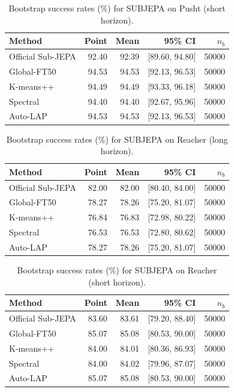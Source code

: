 \begin{table}[t]
\centering
\small
\caption{Bootstrap success rates (\%) for SUBJEPA on Pusht (short horizon).}
\begin{tabular}{lrrrr}
\toprule
Method & Point & Mean & 95\% CI & $n_b$ \\
\midrule
Official Sub-JEPA & 92.40 & 92.39 & [89.60, 94.80] & 50000 \\
Global-FT50 & 94.53 & 94.53 & [92.13, 96.53] & 50000 \\
K-means++ & 94.49 & 94.49 & [93.33, 96.18] & 50000 \\
Spectral & 94.40 & 94.40 & [92.67, 95.96] & 50000 \\
Auto-LAP & 94.53 & 94.53 & [92.13, 96.53] & 50000 \\
\bottomrule
\end{tabular}
\end{table}

\begin{table}[t]
\centering
\small
\caption{Bootstrap success rates (\%) for SUBJEPA on Reacher (long horizon).}
\begin{tabular}{lrrrr}
\toprule
Method & Point & Mean & 95\% CI & $n_b$ \\
\midrule
Official Sub-JEPA & 82.00 & 82.00 & [80.40, 84.00] & 50000 \\
Global-FT50 & 78.27 & 78.26 & [75.20, 81.07] & 50000 \\
K-means++ & 76.84 & 76.83 & [72.98, 80.22] & 50000 \\
Spectral & 76.53 & 76.53 & [72.80, 80.62] & 50000 \\
Auto-LAP & 78.27 & 78.26 & [75.20, 81.07] & 50000 \\
\bottomrule
\end{tabular}
\end{table}

\begin{table}[t]
\centering
\small
\caption{Bootstrap success rates (\%) for SUBJEPA on Reacher (short horizon).}
\begin{tabular}{lrrrr}
\toprule
Method & Point & Mean & 95\% CI & $n_b$ \\
\midrule
Official Sub-JEPA & 83.60 & 83.61 & [79.20, 88.40] & 50000 \\
Global-FT50 & 85.07 & 85.08 & [80.53, 90.00] & 50000 \\
K-means++ & 84.00 & 84.01 & [80.36, 86.93] & 50000 \\
Spectral & 84.00 & 84.02 & [79.96, 87.07] & 50000 \\
Auto-LAP & 85.07 & 85.08 & [80.53, 90.00] & 50000 \\
\bottomrule
\end{tabular}
\end{table}

